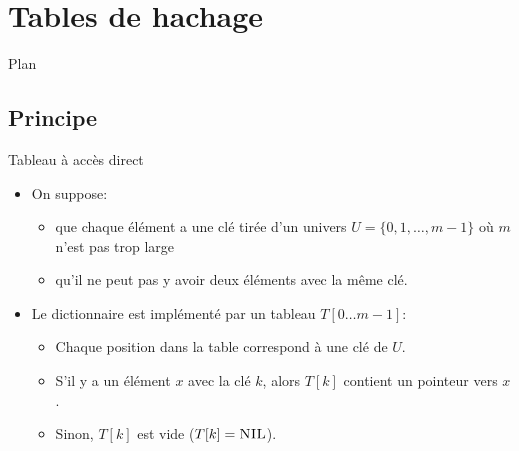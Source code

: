 \section{Tables de hachage}

\begin{frame}{Plan}

\tableofcontents[currentsection]

\end{frame}

\subsection{Principe}

\begin{frame}{Tableau à accès direct}

\begin{itemize}
\item On suppose:
\begin{itemize}
\item que chaque élément a une clé tirée d'un univers $U=\{0,1,\ldots,m-1\}$ où $m$ n'est pas trop large
\item qu'il ne peut pas y avoir deux éléments avec la même clé.
\end{itemize}
\item Le dictionnaire est implémenté par un tableau $T[0\ldots m-1]$:
\begin{itemize}
\item Chaque position dans la table correspond à une clé de $U$.
\item S'il y a un élément $x$ avec la clé $k$, alors $T[k]$ contient un pointeur vers $x$.
\item Sinon, $T[k]$ est vide ($T[k]=\textnormal{\scshape NIL}$).
\end{itemize}
\end{itemize}

\end{frame}

